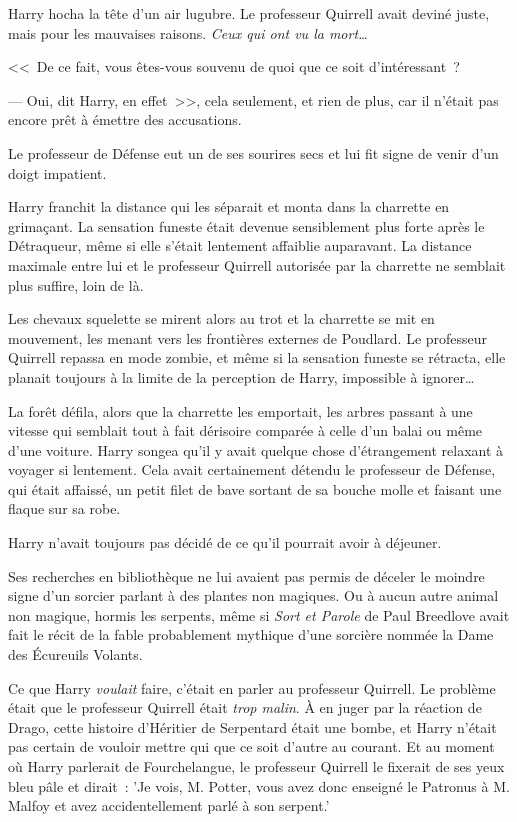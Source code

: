 Harry hocha la tête d'un air lugubre. Le professeur Quirrell avait deviné juste, mais pour les mauvaises raisons. \emph{Ceux qui ont vu la mort…}

<<~De ce fait, vous êtes-vous souvenu de quoi que ce soit d'intéressant~?

--- Oui, dit Harry, en effet~>>, cela seulement, et rien de plus, car il n'était pas encore prêt à émettre des accusations.

Le professeur de Défense eut un de ses sourires secs et lui fit signe de venir d'un doigt impatient.

Harry franchit la distance qui les séparait et monta dans la charrette en grimaçant. La sensation funeste était devenue sensiblement plus forte après le Détraqueur, même si elle s'était lentement affaiblie auparavant. La distance maximale entre lui et le professeur Quirrell autorisée par la charrette ne semblait plus suffire, loin de là.

Les chevaux squelette se mirent alors au trot et la charrette se mit en mouvement, les menant vers les frontières externes de Poudlard. Le professeur Quirrell repassa en mode zombie, et même si la sensation funeste se rétracta, elle planait toujours à la limite de la perception de Harry, impossible à ignorer…

La forêt défila, alors que la charrette les emportait, les arbres passant à une vitesse qui semblait tout à fait dérisoire comparée à celle d'un balai ou même d'une voiture. Harry songea qu'il y avait quelque chose d'étrangement relaxant à voyager si lentement. Cela avait certainement détendu le professeur de Défense, qui était affaissé, un petit filet de bave sortant de sa bouche molle et faisant une flaque sur sa robe.

Harry n'avait toujours pas décidé de ce qu'il pourrait avoir à déjeuner.

Ses recherches en bibliothèque ne lui avaient pas permis de déceler le moindre signe d'un sorcier parlant à des plantes non magiques. Ou à aucun autre animal non magique, hormis les serpents, même si \emph{Sort et Parole} de Paul Breedlove avait fait le récit de la fable probablement mythique d'une sorcière nommée la Dame des Écureuils Volants.

Ce que Harry \emph{voulait} faire, c'était en parler au professeur Quirrell. Le problème était que le professeur Quirrell était \emph{trop malin}. À en juger par la réaction de Drago, cette histoire d'Héritier de Serpentard était une bombe, et Harry n'était pas certain de vouloir mettre qui que ce soit d'autre au courant. Et au moment où Harry parlerait de Fourchelangue, le professeur Quirrell le fixerait de ses yeux bleu pâle et dirait~: 'Je vois, M. Potter, vous avez donc enseigné le Patronus à M. Malfoy et avez accidentellement parlé à son serpent.'

